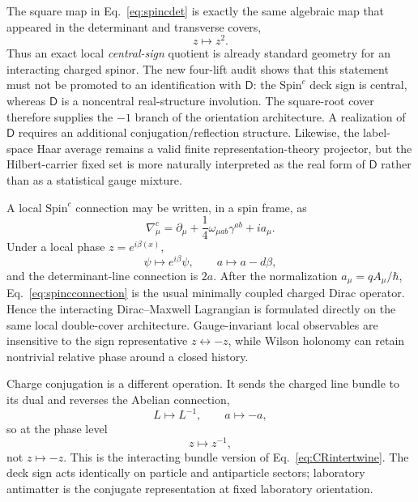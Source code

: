 \documentclass[11pt]{article}
\theoremstyle{definition}\newtheorem{definition}[theorem]{Definition}
\theoremstyle{remark}\newtheorem{remark}[theorem]{Remark}\newtheorem{conjecture}[theorem]{Conjecture}
\begin{document}
The square map in Eq.~\eqref{eq:spincdet} is exactly the same algebraic map that appeared in the determinant and transverse covers,
\begin{equation}
 z\longmapsto z^2.
\end{equation}
Thus an exact local \emph{central-sign} quotient is already standard geometry for an interacting charged spinor. The new four-lift audit shows that this statement must not be promoted to an identification with $\mathsf D$: the $\mathrm{Spin}^c$ deck sign is central, whereas $\mathsf D$ is a noncentral real-structure involution. The square-root cover therefore supplies the $-1$ branch of the orientation architecture. A realization of $\mathsf D$ requires an additional conjugation/reflection structure. Likewise, the label-space Haar average remains a valid finite representation-theory projector, but the Hilbert-carrier fixed set is more naturally interpreted as the real form of $\mathsf D$ rather than as a statistical gauge mixture.

A local $\mathrm{Spin}^c$ connection may be written, in a spin frame, as
\begin{equation}\label{eq:spincconnection}
 \nabla^{c}_\mu
 =\partial_\mu+\frac14\omega_{\mu ab}\gamma^{ab}+i a_\mu.
\end{equation}
Under a local phase $z=e^{i\beta(x)}$,
\begin{equation}\label{eq:spincgaugetransform}
 \psi\mapsto e^{i\beta}\psi,
 \qquad
 a\mapsto a-d\beta,
\end{equation}
and the determinant-line connection is $2a$. After the normalization $a_\mu=qA_\mu/\hbar$, Eq.~\eqref{eq:spincconnection} is the usual minimally coupled charged Dirac operator. Hence the interacting Dirac--Maxwell Lagrangian is formulated directly on the same local double-cover architecture. Gauge-invariant local observables are insensitive to the sign representative $z\leftrightarrow-z$, while Wilson holonomy can retain nontrivial relative phase around a closed history.

Charge conjugation is a different operation. It sends the charged line bundle to its dual and reverses the Abelian connection,
\begin{equation}\label{eq:spincchargeconj}
 L\longmapsto L^{-1},\qquad a\longmapsto-a,
\end{equation}
so at the phase level
\begin{equation}
 \boxed{z\longmapsto z^{-1},}
\end{equation}
not $z\mapsto-z$. This is the interacting bundle version of Eq.~\eqref{eq:CRintertwine}. The deck sign acts identically on particle and antiparticle sectors; laboratory antimatter is the conjugate representation at fixed laboratory orientation.
\end{document}

